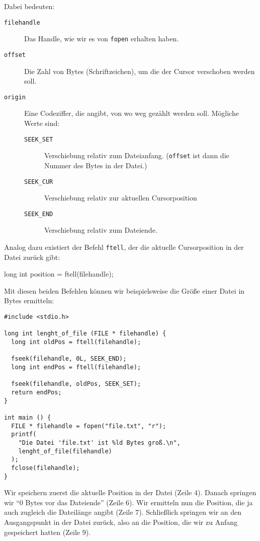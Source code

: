 Dabei bedeuten:
\begin{description}
\item[\texttt{filehandle}] Das Handle, wie wir es von \texttt{fopen} erhalten haben.
\item[\texttt{offset}] Die Zahl von Bytes (\ie Schriftzeichen), um die der Cursor verschoben werden soll.
\item[\texttt{origin}] Eine Codeziffer, die angibt, von wo weg gezählt werden soll. Mögliche Werte sind:
	\begin{description}
	\item[\texttt{SEEK\_SET}] Verschiebung relativ zum Dateianfang. (\texttt{offset} ist dann die Nummer
		 des Bytes in der Datei.)
	\item[\texttt{SEEK\_CUR}] Verschiebung relativ zur aktuellen Cursorposition
	\item[\texttt{SEEK\_END}] Verschiebung relativ zum Dateiende.
	\end{description}
\end{description}

Analog dazu existiert der Befehl \texttt{ftell}, der die aktuelle Cursorposition in der Datei zurück gibt:
\begin{codebox}
long int position = ftell(filehandle);
\end{codebox}

Mit diesen beiden Befehlen können wir beispielsweise die Größe einer Datei in Bytes ermitteln:

\begin{codebox}
\begin{verbatim}
#include <stdio.h>

long int lenght_of_file (FILE * filehandle) {
  long int oldPos = ftell(filehandle);

  fseek(filehandle, 0L, SEEK_END);
  long int endPos = ftell(filehandle);

  fseek(filehandle, oldPos, SEEK_SET);
  return endPos;
}

int main () {
  FILE * filehandle = fopen("file.txt", "r");
  printf(
    "Die Datei 'file.txt' ist %ld Bytes groß.\n",
    lenght_of_file(filehandle)
  );
  fclose(filehandle);
}
\end{verbatim}
\end{codebox}

Wir speichern zuerst die aktuelle Position in der Datei (Zeile 4). Danach springen wir \enquote{0 Bytes vor das Dateiende} (Zeile 6). Wir ermitteln nun die Position, die ja auch zugleich die Dateilänge angibt (Zeile 7). Schließlich springen wir an den Ausgangspunkt in der Datei zurück, also an die Position, die wir zu Anfang gespeichert hatten (Zeile 9).

